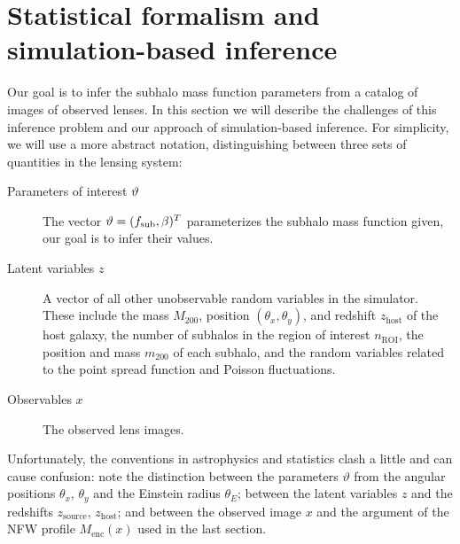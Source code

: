 \documentclass[twocolumn]{aastex62}
\begin{document}
\section{Statistical formalism and simulation-based inference}
\label{sec:lfi-formalism}

Our goal is to infer the subhalo mass function parameters from a catalog of images of observed lenses. In this section we will describe the challenges of this inference problem and our approach of simulation-based inference. For simplicity, we will use a more abstract notation, distinguishing between three sets of quantities in the lensing system:
%
\begin{description}
  \item[Parameters of interest $\vartheta$] The vector $\vartheta = (f_{\mathrm{sub}}, \beta)^T$ parameterizes the subhalo mass function given, our goal is to infer their values.
  \item[Latent variables $z$] A vector of all other unobservable random variables in the simulator. These include the mass $M_{200}$, position $(\theta_x, \theta_y)$, and redshift $z_{\mathrm{host}}$ of the host galaxy, the number of subhalos in the region of interest $n_\mathrm{ROI}$, the position and mass $m_{200}$ of each subhalo, and the random variables related to the point spread function and Poisson fluctuations.
  \item[Observables $x$] The observed lens images.
\end{description}
%
Unfortunately, the conventions in astrophysics and statistics clash a little and can cause confusion: note the distinction between the parameters $\vartheta$ from the angular positions $\theta_x$, $\theta_y$ and the Einstein radius $\theta_E$; between the latent variables $z$ and the redshifts $z_\mathrm{source}$, $z_\mathrm{host}$; and between the observed image $x$ and the argument of the NFW profile $M_\mathrm{enc}(x)$ used in the last section.
\end{document}
